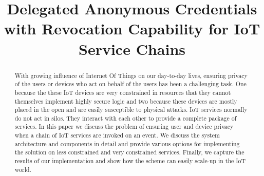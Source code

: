 \documentclass[journal]{IEEEtran}
\begin{document}
\title{Delegated Anonymous Credentials with Revocation Capability for IoT Service Chains}
\author{

}

\IEEEoverridecommandlockouts
{}

\maketitle

\begin{abstract}
With growing influence of Internet Of Things on our day-to-day lives, ensuring privacy of the users or devices who act on behalf of the users has been a challenging task. One because the these IoT devices are very constrained in resources that they cannot themselves implement highly secure logic and two because these devices are mostly placed in the open and are easily susceptible to physical attacks. IoT services normally do not act in silos. They interact with each other to provide a complete package of services. In this paper we discuss the problem of ensuring user and device privacy when a chain of IoT services are invoked on an event. We discuss the system architecture and components in detail and provide various options for implementing the solution on less constrained and very constrained services. Finally, we capture the results of our implementation and show how the scheme can easily scale-up in the IoT world.

\end{abstract}

\begin{IEEEkeywords}

\end{IEEEkeywords}

\IEEEpeerreviewmaketitle
\end{document}
